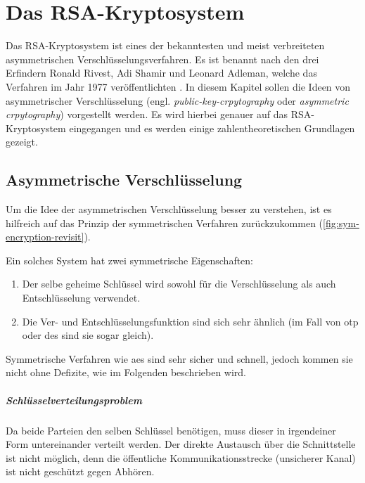 \chapter{Das RSA-Kryptosystem}
Das RSA-Kryptosystem ist eines der bekanntesten und meist
verbreiteten asymmetrischen Verschlüsselungsverfahren. Es ist benannt nach
den drei Erfindern Ronald Rivest, Adi Shamir und Leonard Adleman, welche das Verfahren
im Jahr 1977 veröffentli\-chten \parencite[173]{BOOK:crypto}. In diesem Kapitel
sollen die Ideen von asymmetrischer Verschlüsselung
(engl. \textit{public-key-crpytography} oder \textit{asymmetric crpytography})
vorgestellt werden. Es wird hierbei genauer auf das RSA-Kryptosystem eingegangen und
es werden einige zahlentheoretischen Grundlagen gezeigt.

\section{Asymmetrische Verschlüsselung}
Um die Idee der asymmetrischen Verschlüsselung besser zu verstehen,
ist es hilfreich auf das Prinzip der symmetrischen Verfahren zurückzukommen
(\autoref{fig:sym-encryption-revisit}).



\noindent
Ein solches System hat zwei symmetrische Eigenschaften:
\begin{enumerate}
  \item Der selbe geheime Schlüssel wird sowohl für die
        Verschlüsselung als auch Entschlüsselung verwendet.
  \item Die Ver- und Entschlüsselungsfunktion sind sich sehr ähnlich
        (im Fall von \acs{otp} oder \acs{des} sind sie sogar gleich).
\end{enumerate}
Symmetrische Verfahren wie \acs{aes} sind sehr sicher und schnell,
jedoch kommen sie nicht ohne Defizite, wie im Folgenden beschrieben wird.

\paragraph{Schlüsselverteilungsproblem}
Da beide Parteien den selben Schlüssel benötigen, muss dieser in
irgendeiner Form untereinander verteilt werden.
Der direkte Austausch über die Schnittstelle ist nicht möglich, denn
die öffentliche Kommunikationsstrecke (unsicherer Kanal) ist nicht geschützt gegen Abhören.

